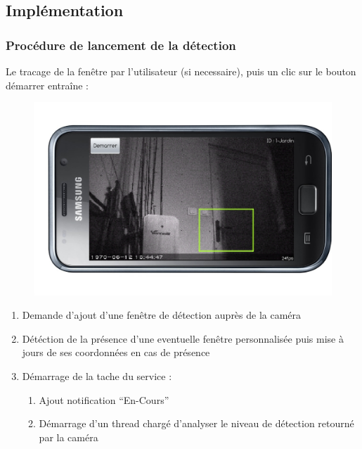   \subsection{Implémentation}
  \begin{frame}
   \frametitle{Procédure de lancement de la détection}
   Le tracage de la fenêtre par l'utilisateur (si necessaire), puis un clic sur
   \newline le bouton démarrer entraîne :
   \begin{figure}[H]
 \centering\includegraphics[scale=0.10]{Images/samsung-galaxy-s-vue3.jpg}
      \end{figure}
    \begin{enumerate}
    \item Demande d'ajout d'une fenêtre de détection auprès de la caméra
    \item Détéction de la présence d'une eventuelle fenêtre personnalisée puis
    mise à jours de ses coordonnées en cas de présence
    \item Démarrage de la tache du service :
     \begin{enumerate}
       \item Ajout notification ``En-Cours''
       \item Démarrage d'un thread chargé d'analyser le niveau de détection
       retourné par la caméra
       \end{enumerate}
   \end{enumerate}
  \end{frame}